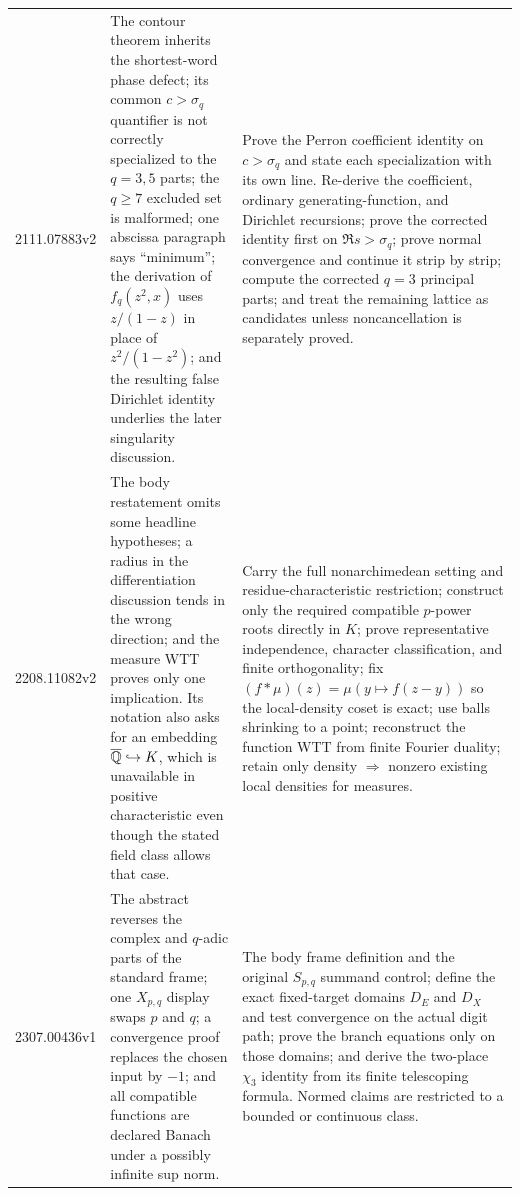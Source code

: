 \begin{longtable}{@{}p{}p{}p{}@{}}
2111.07883v2 & The contour theorem inherits the shortest-word phase defect;
its common $c>\sigma_q$ quantifier is not correctly specialized to the
$q=3,5$ parts; the $q\geq7$ excluded set is malformed; one abscissa paragraph
says ``minimum''; the derivation of $f_q(z^2,x)$ uses $z/(1-z)$ in place of
$z^2/(1-z^2)$; and the resulting false Dirichlet identity underlies the
later singularity discussion. & Prove the Perron coefficient identity on
$c>\sigma_q$ and state each specialization with its own line.  Re-derive
the coefficient, ordinary generating-function, and Dirichlet recursions;
prove the corrected identity first on $\Re s>\sigma_q$; prove normal
convergence and continue it strip by strip; compute the corrected $q=3$
principal parts; and treat the remaining lattice as candidates unless
noncancellation is separately proved.\\

2208.11082v2 & The body restatement omits some headline hypotheses; a radius
in the differentiation discussion tends in the wrong direction; and the
measure WTT proves only one implication.  Its notation also asks for an
embedding $\overline{\mathbb Q}\hookrightarrow K$, which is unavailable in positive
characteristic even though the stated field class allows that case. & Carry
the full nonarchimedean setting and residue-characteristic restriction;
construct only the required compatible $p$-power roots directly in $K$;
prove representative independence, character classification, and finite
orthogonality; fix $(f*\mu)(z)=\mu(y\mapsto f(z-y))$ so the local-density
coset is exact; use balls shrinking to a point; reconstruct the function WTT
from finite Fourier duality; retain only density $\Rightarrow$ nonzero
existing local densities for measures.\\

2307.00436v1 & The abstract reverses the complex and $q$-adic parts of the
standard frame; one $X_{p,q}$ display swaps $p$ and $q$; a convergence proof
replaces the chosen input by $-1$; and all compatible functions are declared
Banach under a possibly infinite sup norm. & The body frame definition and
the original $S_{p,q}$ summand control; define the exact fixed-target domains
$D_E$ and $D_X$ and test convergence on the actual digit path; prove the
branch equations only on those domains; and derive the two-place $\chi_3$
identity from its finite telescoping formula.  Normed claims are restricted to
a bounded or continuous class.\\


\end{longtable}
